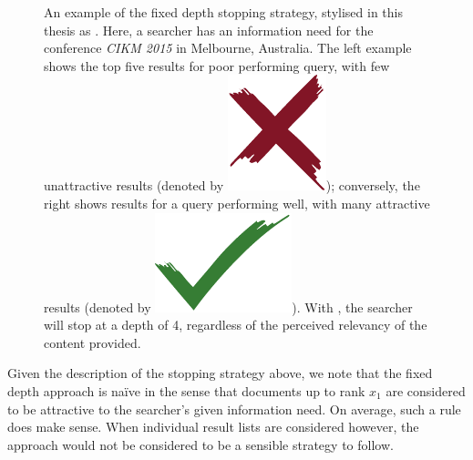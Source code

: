\begin{figure}[t!]
    \centering
    \caption[Examples of the fixed depth stopping strategy, ]{An example of the fixed depth stopping strategy, stylised in this thesis as . Here, a searcher has an information need for the conference \emph{CIKM 2015} in Melbourne, Australia. The left example shows the top five results for poor performing query, with few unattractive results (denoted by {\includegraphics[height=\fontcharht\font`\d]{figures/ch0-cross.pdf}}); conversely, the right shows results for a query performing well, with many attractive results (denoted by {\includegraphics[height=\fontcharht\font`\d]{figures/ch0-tick.pdf}}). With , the searcher will stop at a depth of 4, regardless of the perceived relevancy of the content provided.}
    \label{fig:ss1}
\end{figure}

Given the description of the stopping strategy above, we note that the fixed depth approach is na\"{i}ve in the sense that documents up to rank $x_1$ are considered to be attractive to the searcher's given information need. On average, such a rule does make sense. When individual result lists are considered however, the approach would not be considered to be a sensible strategy to follow.

